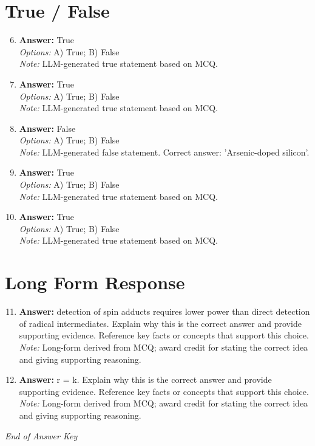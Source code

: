 \documentclass[12pt]{article}
\begin{document}
\section*{True / False}
\begin{enumerate}[label=\arabic*.]
\setcounter{enumi}{5}
\item \textbf{Answer:} True
\\ \textit{Options:} A) True; B) False
\\ \textit{Note:} LLM-generated true statement based on MCQ.
\item \textbf{Answer:} True
\\ \textit{Options:} A) True; B) False
\\ \textit{Note:} LLM-generated true statement based on MCQ.
\item \textbf{Answer:} False
\\ \textit{Options:} A) True; B) False
\\ \textit{Note:} LLM-generated false statement. Correct answer: 'Arsenic-doped silicon'.
\item \textbf{Answer:} True
\\ \textit{Options:} A) True; B) False
\\ \textit{Note:} LLM-generated true statement based on MCQ.
\item \textbf{Answer:} True
\\ \textit{Options:} A) True; B) False
\\ \textit{Note:} LLM-generated true statement based on MCQ.
\end{enumerate}

\section*{Long Form Response}
\begin{enumerate}[label=\arabic*.]
\setcounter{enumi}{10}
\item \textbf{Answer:} detection of spin adducts requires lower power than direct detection of radical intermediates. Explain why this is the correct answer and provide supporting evidence. Reference key facts or concepts that support this choice.
\\ \textit{Note:} Long-form derived from MCQ; award credit for stating the correct idea and giving supporting reasoning.
\item \textbf{Answer:} r = k. Explain why this is the correct answer and provide supporting evidence. Reference key facts or concepts that support this choice.
\\ \textit{Note:} Long-form derived from MCQ; award credit for stating the correct idea and giving supporting reasoning.
\end{enumerate}

\vfill
\noindent\textit{End of Answer Key}
\end{document}
